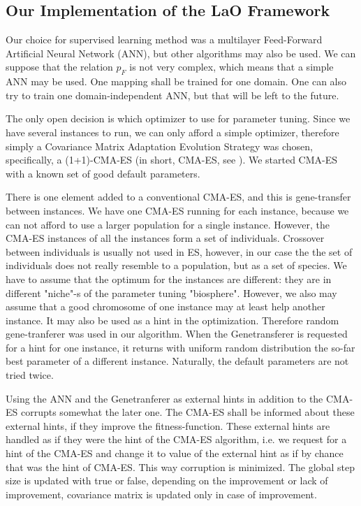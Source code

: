\documentclass{acm_proc_article-sp}
\begin{document}
\subsection{Our Implementation of the LaO Framework}

Our choice for supervised learning method was a multilayer Feed-Forward Artificial Neural Network (ANN), but other algorithms may also be used. We can suppose that the relation \begin{math}p_F\end{math} is not very complex, which means that a simple ANN may be used. One mapping shall be trained for one domain. One can also try to train one domain-independent ANN, but that will be left to the future.

The only open decision is which optimizer to use for parameter tuning. Since we have several instances to run, we can only afford a simple optimizer, therefore simply a Covariance Matrix Adaptation Evolution Strategy was chosen, specifically, a (1+1)-CMA-ES (in short, CMA-ES, see \cite{hansen2001ecj}). We started CMA-ES with a known set of good default parameters.

There is one element added to a conventional CMA-ES, and this is gene-transfer between instances. We have one CMA-ES running for each instance, because we can not afford to use a larger population for a single instance. However, the CMA-ES instances of all the instances form a set of individuals. Crossover between individuals is usually not used in ES, however, in our case the the set of individuals does not really resemble to a population, but as a set of species. We have to assume that the optimum for the instances are different: they are in different "niche"-s of the parameter tuning "biosphere". However, we also may assume that a good chromosome of one instance may at least help another instance. It may also be used as a hint in the optimization. Therefore random gene-tranferer was used in our algorithm. When the Genetransferer is requested for a hint for one instance, it returns with uniform random distribution the so-far best parameter of a different instance. Naturally, the default parameters are not tried twice.

Using the ANN and the Genetranferer as external hints in addition to the CMA-ES corrupts somewhat the later one. The CMA-ES shall be informed about these external hints, if they improve the fitness-function. These external hints are handled as if they were the hint of the CMA-ES algorithm, i.e. we request for a hint of the CMA-ES and change it to value of the external hint as if by chance that was the hint of CMA-ES. This way corruption is minimized. The global step size is updated with true or false, depending on the improvement or lack of improvement, covariance matrix is updated only in case of improvement.
\end{document}
